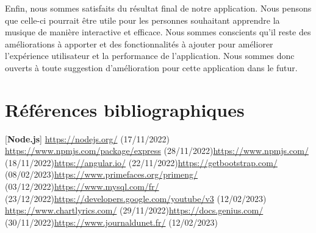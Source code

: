 \documentclass[12pt,french]{article}
\begin{document}
\medskip

Enfin, nous sommes satisfaits du résultat final de notre application. Nous pensons que celle-ci pourrait être utile pour les personnes souhaitant apprendre la musique de manière interactive et efficace. Nous sommes conscients qu'il reste des améliorations à apporter et des fonctionnalités à ajouter pour améliorer l'expérience utilisateur et la performance de l'application. Nous sommes donc ouverts à toute suggestion d'amélioration pour cette application dans le futur.

\newpage
\vspace*{1cm}

\section*{Références bibliographiques}

[\textbf{Node.js}] \href{https://nodejs.org/}{https://nodejs.org/} (17/11/2022) \newline{} \href{https://www.npmjs.com/package/express}{https://www.npmjs.com/package/express} (28/11/2022)\newline{} \href{https://www.npmjs.com/}{https://www.npmjs.com/} (18/11/2022)\newline{} \href{https://angular.io/}{https://angular.io/} (22/11/2022)\newline{} \href{https://getbootstrap.com/}{https://getbootstrap.com/} (08/02/2023)\newline{} \href{https://www.primefaces.org/primeng/}{https://www.primefaces.org/primeng/} (03/12/2022)\newline{} \href{https://www.mysql.com/fr/}{https://www.mysql.com/fr/} (23/12/2022)\newline{} \href{https://developers.google.com/youtube/v3}{https://developers.google.com/youtube/v3} (12/02/2023) \newline{} \href{https://www.chartlyrics.com/}{https://www.chartlyrics.com/} (29/11/2022)\newline{} \href{https://docs.genius.com/}{https://docs.genius.com/} (30/11/2022)\newline{} \href{https://www.journaldunet.fr/}{https://www.journaldunet.fr/} (12/02/2023)\newline



\printglossary[type=main, title=Glossaire]
\end{document}
